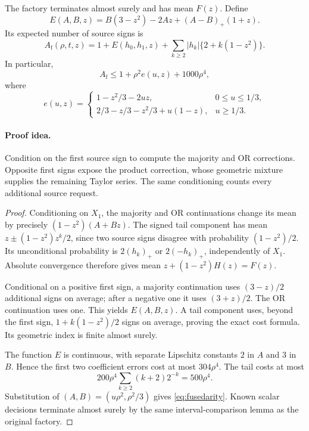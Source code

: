 \begin{lemma}\label{lem:fusedfactory}
The factory terminates almost surely and has mean \(F(z)\).
Define
\[
 E(A,B,z)=B(3-z^2)-2Az+(A-B)_+(1+z).
\]
Its expected number of source signs is
\[
 A_{\mathrm f}(\rho,t,z)
 =1+E(h_0,h_1,z)
   +\sum_{k\ge2}|h_k|\{2+k(1-z^2)\}.
\]
In particular,
\begin{equation}\label{eq:fusedarity}
 A_{\mathrm f}\le1+\rho^2 e(u,z)+1000\rho^4,
\end{equation}
where
\[
 e(u,z)=
 \begin{cases}
  1-z^2/3-2uz,&0\le u\le1/3,\\
  2/3-z/3-z^2/3+u(1-z),&u\ge1/3.
 \end{cases}
\]
\end{lemma}
\paragraph{Proof idea.}
Condition on the first source sign to compute the majority and OR
corrections. Opposite first signs expose the product correction, whose
geometric mixture supplies the remaining Taylor series. The same
conditioning counts every additional source request.

\begin{proof}
Conditioning on \(X_1\), the majority and OR continuations
change its mean by precisely \((1-z^2)(A+Bz)\).
The signed tail component has mean
\(z\pm(1-z^2)z^k/2\), since two source signs disagree with
probability \((1-z^2)/2\).  Its unconditional probability is
\(2(h_k)_+\) or \(2(-h_k)_+\), independently of \(X_1\).
Absolute convergence therefore gives mean
\(z+(1-z^2)H(z)=F(z)\).

Conditional on a positive first sign, a majority continuation
uses \((3-z)/2\) additional signs on average; after a negative
one it uses \((3+z)/2\).  The OR continuation uses one.
This yields \(E(A,B,z)\).  A tail component uses, beyond the
first sign, \(1+k(1-z^2)/2\) signs on average, proving the
exact cost formula.  Its geometric index is finite almost surely.

The function \(E\) is continuous, with separate Lipschitz
constants \(2\) in \(A\) and \(3\) in \(B\).  Hence the first
two coefficient errors cost at most \(304\rho^4\).
The tail costs at most
\[
 200\rho^4\sum_{k\ge2}(k+2)2^{-k}=500\rho^4.
\]
Substitution of \((A,B)=(u\rho^2,\rho^2/3)\) gives
\eqref{eq:fusedarity}.  Known scalar decisions terminate almost
surely by the same interval-comparison lemma as the original
factory.
\end{proof}

